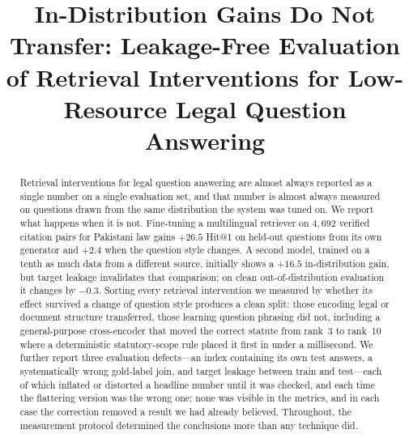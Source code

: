 \documentclass[conference]{IEEEtran}
\begin{document}
\title{In-Distribution Gains Do Not Transfer: Leakage-Free Evaluation of
Retrieval Interventions for Low-Resource Legal Question Answering}

\author{
}

\maketitle

\begin{abstract}
Retrieval interventions for legal question answering are almost always reported
as a single number on a single evaluation set, and that number is almost always
measured on questions drawn from the same distribution the system was tuned on.
We report what happens when it is not. Fine-tuning a multilingual retriever on
$4{,}692$ verified citation pairs for Pakistani law gains $+26.5$ Hit@1 on
held-out questions from its own generator and $+2.4$ when the question style
changes. A second model, trained on a tenth as much data from a different source,
initially shows a $+16.5$ in-distribution gain, but target leakage invalidates that
comparison; on clean out-of-distribution evaluation it changes by $-0.3$. Sorting every retrieval intervention we measured by whether its effect
survived a change of question style produces a clean split: those encoding legal
or document structure transferred, those learning question phrasing did not, including
a general-purpose cross-encoder that moved the correct statute from rank~3 to
rank~10 where a deterministic statutory-scope rule placed it first in under a
millisecond. We further report three evaluation defects---an index containing its
own test answers, a systematically wrong gold-label join, and target leakage between train and test---each of which inflated or distorted a headline number until it was
checked, and each time the flattering version was the wrong one; none was
visible in the metrics, and in each case the correction removed a result we had
already believed. Throughout, the measurement protocol determined the
conclusions more than any technique did.
\end{abstract}
\end{document}
